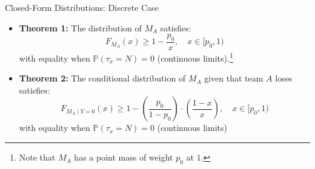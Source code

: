 \documentclass{beamer}
\begin{document}
\begin{frame}{Closed-Form Distributions: Discrete Case}
  \begin{itemize}
    \item \textbf{Theorem 1:} The distribution of $M_A$ satisfies:
    \begin{equation*}
      F_{M_A}(x) \geq 1 - \frac{p_0}{x}, \quad x \in [p_0, 1)
    \end{equation*}
    with equality when $\mathbb{P}(\tau_x = N) = 0$ (continuous limits).\footnote{Note that $M_A$ has a point mass of weight $p_0$ at $1$.}
    \pause
    \item \textbf{Theorem 2:} The conditional distribution of $M_A$ given that team $A$ loses satisfies:
    \begin{equation*}
      F_{M_A \mid Y = 0}(x) \geq 1 - \left(\frac{p_0}{1-p_0}\right) \cdot \left(\frac{1 - x}{x}\right), \quad x \in [p_0, 1)
    \end{equation*}
    with equality when $\mathbb{P}(\tau_x = N) = 0$ (continuous limits)
  \end{itemize}
\end{frame}
\end{document}
